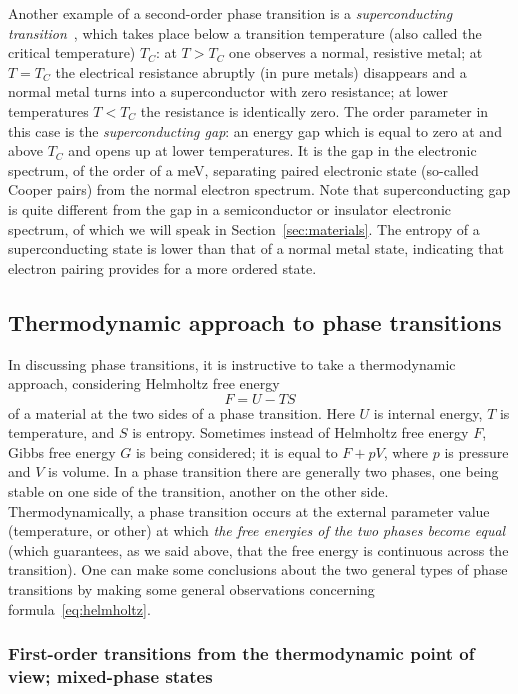 \documentclass[11pt,a4paper]{article}
\begin{document}
Another example of a second-order phase transition is a \emph{superconducting
transition}~\cite{ref:ashcroft}, which takes place below a transition temperature
(also called the critical temperature) $T_C$: at $T > T_C$ one observes a normal,
resistive metal; at $T = T_C$ the electrical resistance abruptly (in pure metals)
disappears and a normal metal turns into a superconductor with zero resistance;
at lower temperatures $T < T_C$ the resistance is identically zero. The order
parameter in this case is the \emph{superconducting gap}: an energy gap which is
equal to zero at and above $T_C$ and opens up at lower temperatures. It is the gap
in the electronic spectrum, of the order of a meV, separating paired electronic
state (so-called Cooper pairs) from the normal electron spectrum. Note that
superconducting gap is quite different from the gap in a semiconductor or
insulator electronic spectrum, of which we will speak in
Section~\ref{sec:materials}. The entropy of a superconducting state is lower than
that of a normal metal state, indicating that electron pairing provides for a
more ordered state.

\subsection{Thermodynamic approach to phase transitions}

In discussing phase transitions, it is instructive to take a thermodynamic
approach, considering Helmholtz free energy
\begin{equation}\label{eq:helmholtz}
  F = U - TS
\end{equation}
of a material at the two sides of a phase transition. Here $U$ is internal
energy, $T$ is temperature, and $S$ is entropy. Sometimes instead of Helmholtz
free energy $F$, Gibbs free energy $G$ is being considered; it is equal to
$F + pV$, where $p$ is pressure and $V$ is volume. In a phase transition there are
generally two phases, one being stable on one side of the transition, another on
the other side. Thermodynamically, a phase transition occurs at the external
parameter value (temperature, or other) at which \emph{the free energies of the
two phases become equal} (which guarantees, as we said above, that the free energy
is continuous across the transition). One can make some conclusions about the two
general types of phase transitions by making some general observations concerning
formula~\eqref{eq:helmholtz}.

\subsubsection{First-order transitions from the thermodynamic point of view;
               mixed-phase states}
\end{document}
